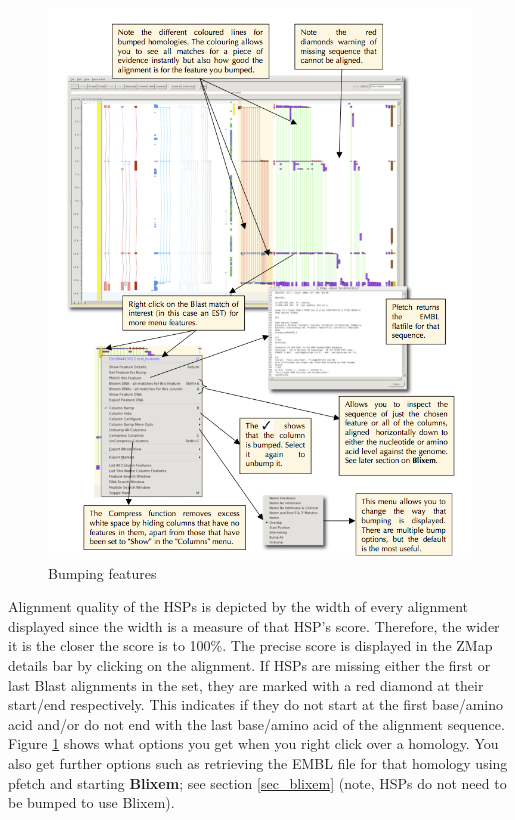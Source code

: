 \documentclass[letterpaper]{article}
\newcounter{Figure}
\begin{document}
\begin{figure}
\centering
\color[rgb]{0.30980393,0.5058824,0.7411765}
\includegraphics[width=15.231cm]{img_bumping.png}
\caption{Bumping features}
\label{img_bumping}
\end{figure}

Alignment quality of the HSPs is depicted by the width of every alignment displayed since the width is a measure of that HSP's score. Therefore, the wider it is the closer the score is to 100\%. The precise score is displayed in the ZMap details bar by clicking on the alignment. If HSPs are missing either the first or last Blast alignments in the set, they are marked with a red diamond at their start/end respectively. This indicates if they do not start at the first base/amino acid and/or do not end with the last base/amino acid of the alignment sequence. Figure \ref{img_bumping} shows what options you get when you right click over a homology. You also get further options such as retrieving the EMBL file for that homology using pfetch and starting \textbf{Blixem}; see section \ref{sec_blixem} (note, HSPs do not need to be bumped to use Blixem).
\end{document}
